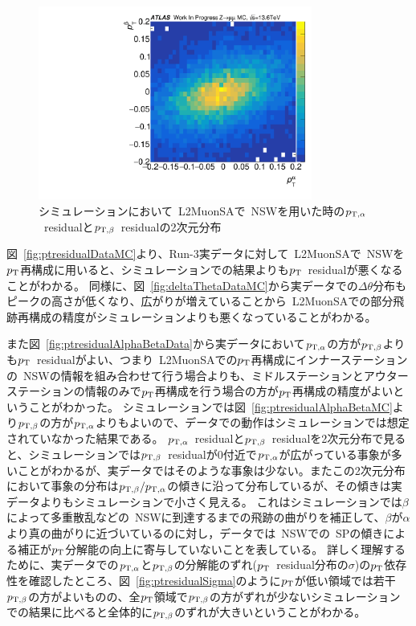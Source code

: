 \begin{figure}
    \centering
    \includegraphics[clip, width=9cm]{fig/5/ptresidual_alpha_beta_MC.pdf}
    \caption{シミュレーションにおいて~L2MuonSAで~NSWを用いた時の$p_{\mathrm{T}, \alpha}$~residualと$p_{\mathrm{T}, \beta}$~residualの2次元分布}
    \label{fig:2DptresidualAlphaBetaMC}
\end{figure}


図~\ref{fig:ptresidualDataMC}より、Run-3実データに対して~L2MuonSAで~NSWを$p_\mathrm{T}$再構成に用いると、シミュレーションでの結果よりも$p_\mathrm{T}$~residualが悪くなることがわかる。
同様に、図~\ref{fig:deltaThetaDataMC}から実データでの$\Delta \theta$分布もピークの高さが低くなり、広がりが増えていることから~L2MuonSAでの部分飛跡再構成の精度がシミュレーションよりも悪くなっていることがわかる。

また図~\ref{fig:ptresidualAlphaBetaData}から実データにおいて$p_{\mathrm{T}, \alpha}$の方が$p_{\mathrm{T}, \beta}$よりも$p_\mathrm{T}$~residualがよい、つまり~L2MuonSAでの$p_\mathrm{T}$再構成にインナーステーションの~NSWの情報を組み合わせて行う場合よりも、ミドルステーションとアウターステーションの情報のみで$p_\mathrm{T}$再構成を行う場合の方が$p_\mathrm{T}$再構成の精度がよいということがわかった。
シミュレーションでは図~\ref{fig:ptresidualAlphaBetaMC}より$p_{\mathrm{T}, \beta}$の方が$p_{\mathrm{T}, \alpha}$よりもよいので、データでの動作はシミュレーションでは想定されていなかった結果である。
$p_{\mathrm{T}, \alpha}$~residualと$p_{\mathrm{T}, \beta}$~residualを2次元分布で見ると、シミュレーションでは$p_{\mathrm{T}, \beta}$~residualが0付近で$p_{\mathrm{T}, \alpha}$が広がっている事象が多いことがわかるが、実データではそのような事象は少ない。またこの2次元分布において事象の分布は$p_{\mathrm{T}, \beta}/p_{\mathrm{T}, \alpha}$の傾きに沿って分布しているが、その傾きは実データよりもシミュレーションで小さく見える。
これはシミュレーションでは$\beta$によって多重散乱などの~NSWに到達するまでの飛跡の曲がりを補正して、$\beta$が$\alpha$より真の曲がりに近づいているのに対し，データでは~NSWでの~SPの傾きによる補正が$p_\mathrm{T}$分解能の向上に寄与していないことを表している。
詳しく理解するために、実データでの$p_{\mathrm{T}, \alpha}$と$p_{\mathrm{T}, \beta}$の分解能のずれ($p_\mathrm{T}$~residual分布の$\sigma$)の$p_\mathrm{T}$依存性を確認したところ、図~\ref{fig:ptresidualSigma}のように$p_\mathrm{T}$が低い領域では若干$p_{\mathrm{T}, \beta}$の方がよいものの、全$p_\mathrm{T}$領域で$p_{\mathrm{T}, \beta}$の方がずれが少ないシミュレーションでの結果に比べると全体的に$p_{\mathrm{T}, \beta}$のずれが大きいということがわかる。

